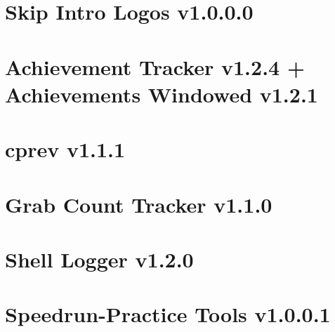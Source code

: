 \documentclass[lualatex,a4paper,fontsize=11pt,jafontscale=0.9247,titlepage,oneside]{jlreq}
\begin{document}
\section{Skip Intro Logos v1.0.0.0}
\section{Achievement Tracker v1.2.4 + Achievements Windowed v1.2.1}
\section{cprev v1.1.1}
\section{Grab Count Tracker v1.1.0}
\section{Shell Logger v1.2.0}
\section{Speedrun-Practice Tools v1.0.0.1}
\end{document}
